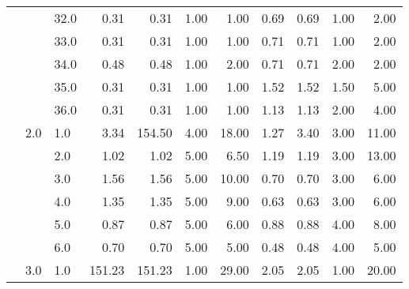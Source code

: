 \begin{tabular}{lllrrrrrrrr}
       &     & 32.0 &       0.31 &      0.31 &  1.00 &   1.00 &       0.69 &      0.69 &  1.00 &   2.00 \\
       &     & 33.0 &       0.31 &      0.31 &  1.00 &   1.00 &       0.71 &      0.71 &  1.00 &   2.00 \\
       &     & 34.0 &       0.48 &      0.48 &  1.00 &   2.00 &       0.71 &      0.71 &  2.00 &   2.00 \\
       &     & 35.0 &       0.31 &      0.31 &  1.00 &   1.00 &       1.52 &      1.52 &  1.50 &   5.00 \\
       &     & 36.0 &       0.31 &      0.31 &  1.00 &   1.00 &       1.13 &      1.13 &  2.00 &   4.00 \\
       & 2.0 & 1.0  &       3.34 &    154.50 &  4.00 &  18.00 &       1.27 &      3.40 &  3.00 &  11.00 \\
       &     & 2.0  &       1.02 &      1.02 &  5.00 &   6.50 &       1.19 &      1.19 &  3.00 &  13.00 \\
       &     & 3.0  &       1.56 &      1.56 &  5.00 &  10.00 &       0.70 &      0.70 &  3.00 &   6.00 \\
       &     & 4.0  &       1.35 &      1.35 &  5.00 &   9.00 &       0.63 &      0.63 &  3.00 &   6.00 \\
       &     & 5.0  &       0.87 &      0.87 &  5.00 &   6.00 &       0.88 &      0.88 &  4.00 &   8.00 \\
       &     & 6.0  &       0.70 &      0.70 &  5.00 &   5.00 &       0.48 &      0.48 &  4.00 &   5.00 \\
       & 3.0 & 1.0  &     151.23 &    151.23 &  1.00 &  29.00 &       2.05 &      2.05 &  1.00 &  20.00 \\
\bottomrule
\end{tabular}
